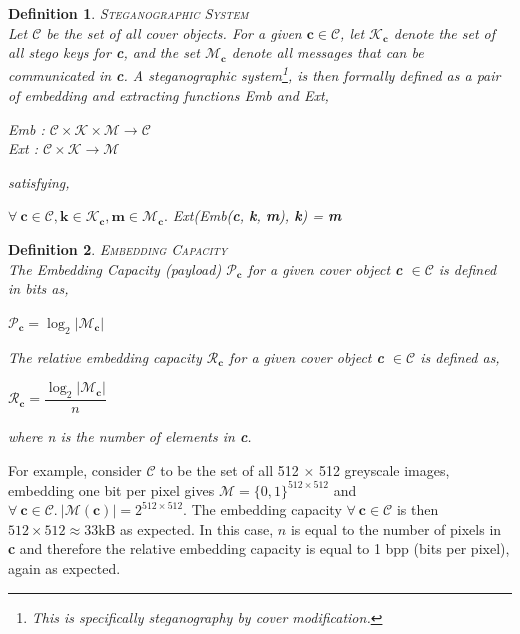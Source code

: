 \documentclass[paper=a4, fontsize=11pt,twoside]{scrartcl}
\numberwithin{table}{section}
\numberwithin{figure}{section}
\numberwithin{algorithm}{section}
\newtheorem{ddef}{Definition}[section]
\begin{document}
\begin{ddef}
\textsc{Steganographic System}\\[5pt]
Let $\mathcal{C}$ be the set of all cover objects. For a given $\textbf{c} \in \mathcal{C}$, let $\mathcal{K} _{\textbf{c}}$ denote the set of all stego keys for \textbf{c}, and the set $\mathcal{M} _{\textbf{c}}$ denote all messages that can be communicated in \textbf{c}. A steganographic system\footnote{This is specifically steganography by cover modification.}, is then formally defined as a pair of embedding and extracting functions Emb and Ext,
\begin{center}
	Emb :  $\mathcal{C} \times \mathcal{K} \times \mathcal{M} \rightarrow \mathcal{C}$\\
	Ext :  $\mathcal{C} \times \mathcal{K} \rightarrow \mathcal{M}$\\
\end{center}
satisfying,
\begin{center}
	$\forall ~\textbf{c} \in \mathcal{C}, \textbf{k} \in \mathcal{K}_{\textbf{c}}, \textbf{m} \in \mathcal{M}_{\textbf{c}}.$ Ext(Emb(\textbf{c}, \textbf{k}, \textbf{m}), \textbf{k}) = \textbf{m}	
\end{center}
\end{ddef}
\begin{ddef}
\textsc{Embedding Capacity}\\[5pt]
The \textit{Embedding Capacity} (payload) $\mathcal{P} _{\textbf{c}}$ for a given cover object \textbf{c} $\in \mathcal{C}$ is defined in bits as,
\begin{center}
	$\mathcal{P} _{\textbf{c}} = \log_{2}|\mathcal{M}_{\textbf{c}}| $
\end{center}
The relative embedding capacity $\mathcal{R} _{\textbf{c}}$ for a given cover object \textbf{c} $\in \mathcal{C}$ is defined as,
\begin{center}
	$\mathcal{R} _{\textbf{c}} = \dfrac{\log_{2}|\mathcal{M}_{\textbf{c}}|}{n} $
\end{center}
where n is the number of elements in \textbf{c}.
\end{ddef}
\noindent
For example, consider $\mathcal{C}$ to be the set of all 512 $\times$ 512 greyscale images, embedding one bit per pixel gives $\mathcal{M} = \{0,1\}^{512 \times 512}$ and $\forall ~\textbf{c} \in \mathcal{C}. ~|\mathcal{M}(\textbf{c})| = 2^{512 \times 512}$. The embedding capacity $\forall ~\textbf{c} \in \mathcal{C}$ is then $512 \times 512 \approx 33$kB as expected. In this case, $n$ is equal to the number of pixels in \textbf{c} and therefore the relative embedding capacity is equal to 1 bpp (bits per pixel), again as expected.
\end{document}
